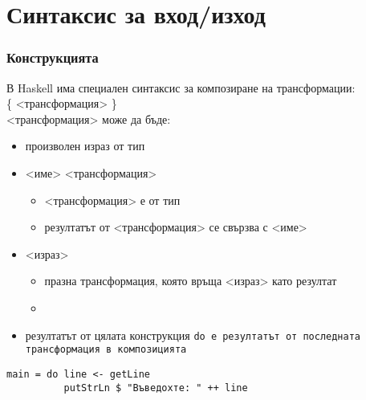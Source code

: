 \documentclass[alsotrans]{beamerswitch}
\begin{document}
\section{Синтаксис за вход/изход}

\begin{frame}[fragile]
  \frametitle{Конструкцията }

  В Haskell има специален синтаксис за композиране на трансформации:\\[1em]
   \{ <трансформация> \}\\[1em]
  \pause
  <трансформация> може да бъде:
  \begin{itemize}[<+->]
  \item произволен израз от тип 
  \item{} <име> \tta{<-} <трансформация>
    \begin{itemize}
    \item{} <трансформация> е от тип 
    \item резултатът от <трансформация> се свързва с <име>
    \end{itemize}
  \item {} <израз>
    \begin{itemize}
    \item празна трансформация, която връща <израз> като резултат
    \item {}
    \end{itemize}
  \item резултатът от цялата конструкция \tt{do} е резултатът от последната трансформация в композицията
  \end{itemize}
  \onslide<+->
\begin{lstlisting}
main = do line <- getLine
          putStrLn $ "Въведохте: " ++ line
\end{lstlisting}
\end{frame}
\end{document}
